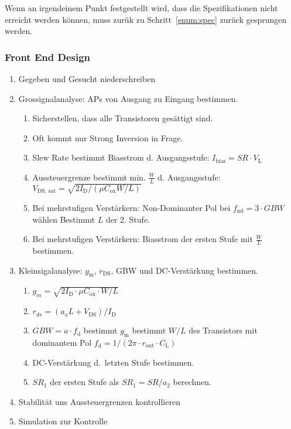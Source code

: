 Wenn an irgendeinem Punkt festgestellt wird, dass die Spezifikationen nicht erreicht werden können, muss zurük zu Schritt~\ref{enum:spec} zurück gesprungen werden.

\subsubsection{Front End Design}
\begin{enumerate}
    \item Gegeben und Gesucht niederschreiben
    \item Grossignalanalyse: APs von Ausgang zu Eingang bestimmen.
    \begin{enumerate}[a]
        \item Sicherstellen, dass alle Transistoren gesättigt sind.
        \item Oft kommt nur Strong Inversion in Frage.
        \item Slew Rate bestimmt Biasstrom d. Ausgangsstufe: $I_\text{bias} = SR \cdot V_\text{L}$
        \item Aussteuergrenze bestimmt min. $\frac{W}{L}$ d. Ausgangsstufe: $V_\text{DS, sat} = \sqrt{2 I_\text{D} / (\mu C_\text{ox} W/L)}$
        \item Bei mehrstufigen Verstärkern: Non-Dominanter Pol bei $f_\text{nd} = 3 \cdot GBW$ wählen \textrightarrow Bestimmt $L$ der 2. Stufe.
        \item Bei mehrstufigen Verstärkern: Biasstrom der ersten Stufe mit $\frac{W}{L}$ bestimmen.
    \end{enumerate}
    \item Kleinsigalanalyse: $g_\text{m}$, $r_\text{DS}$, GBW und DC-Verstärkung bestimmen.
    \begin{enumerate}[a]
        \item $g_m = \sqrt{2I_\text{D} \cdot \mu C_\text{ox} \cdot W/L}$
        \item $r_{ds} = (a_\text{a} L + V_\text{DS}) / I_\text{D}$
        \item $GBW = a \cdot f_\text{d}$ bestimmt $g_\text{m}$ bestimmt $W/L$ des Transistors mit dominantem Pol $f_\text{d} = 1/(2\pi \cdot r_\text{out} \cdot C_\text{L})$
        \item DC-Verstärkung d.\ letzten Stufe bestimmen.
        \item $SR_1$ der ersten Stufe als $SR_1 = SR/a_2$ berechnen.
    \end{enumerate}
    \item Stabilität uns Aussteuergrenzen kontrollieren
    \item Simulation zur Kontrolle
\end{enumerate}


